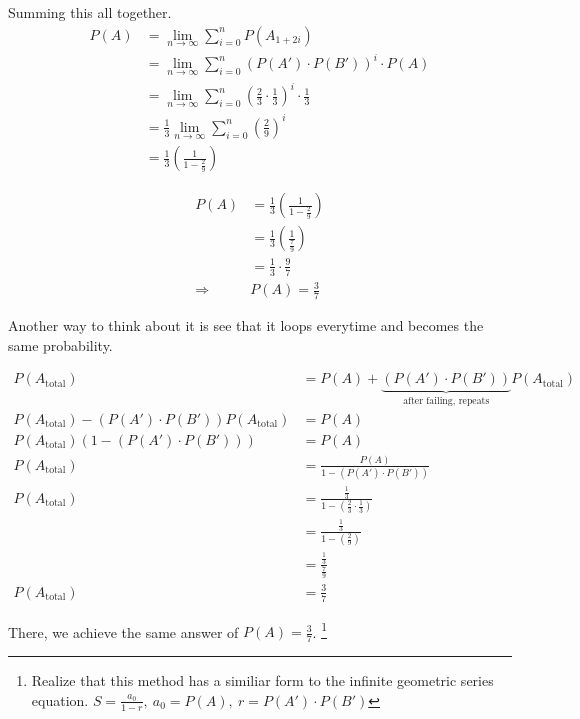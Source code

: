 \begin{solution}
Summing this all together.
\begin{align*}
    P(A) &= \lim_{n \to \infty} \sum_{i=0}^{n} P(A_{1+2i}) \\
         &= \lim_{n \to \infty} \sum_{i=0}^{n} \left(P(A') \cdot P(B')\right)^{i} \cdot P(A) \\
         &= \lim_{n \to \infty} \sum_{i=0}^{n} \left(\frac{2}{3} \cdot \frac{1}{3}\right)^{i} \cdot \frac{1}{3} \\
         &= \frac{1}{3} \lim_{n \to \infty} \sum_{i=0}^{n} \left(\frac{2}{9}\right)^{i} \\
         &= \frac{1}{3} \left(\frac{1}{1-\frac{2}{9}}\right)
\end{align*}

\begin{align*}
    P(A) &= \frac{1}{3} \left(\frac{1}{1-\frac{2}{9}}\right) \\
         &= \frac{1}{3} \left(\frac{1}{\frac{7}{9}}\right) \\
         &= \frac{1}{3} \cdot \frac{9}{7} \\
         \Longrightarrow & \boxed{P(A) =  \frac{3}{7}}
\end{align*}

Another way to think about it is see that it loops everytime and 
becomes the same probability.

\begin{align*}
    P(A_{\text{total}}) &= P(A) + \underbrace{\left(P(A') \cdot P(B')\right)}_{\text{after failing, repeats}}   P(A_{\text{total}}) \\
    P(A_{\text{total}}) - \left(P(A') \cdot P(B')\right)  P(A_{\text{total}}) &= P(A) \\
    P(A_{\text{total}}) \left(1 - \left(P(A') \cdot P(B')\right)\right) &= P(A) \\
    P(A_{\text{total}})
    &= \frac{P(A)}{1 - \left(P(A') \cdot P(B')\right)} \\
    P(A_{\text{total}}) &= \frac{\frac{1}{3}}{1 - \left(\frac{2}{3} \cdot \frac{1}{3}\right)} \\
                        &= \frac{\frac{1}{3}}{1 - \left(\frac{2}{9}\right)} \\
                        &= \frac{\frac{1}{3}}{\frac{7}{9}} \\
    P(A_{\text{total}}) &= \boxed{\frac{3}{7}}
\end{align*} 

There, we achieve the same answer of $\boxed{P(A) = \frac{3}{7}}$. \footnote{Realize that this method has a similiar form to the infinite geometric series equation. $S = \frac{a_{0}}{1-r}, \ a_{0} = P(A), \ r = P(A') \cdot P(B')$}

\end{solution}